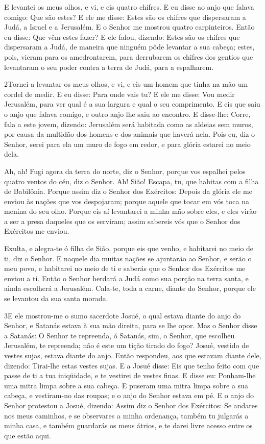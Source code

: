 E levantei os meus olhos, e vi, e eis quatro chifres. E eu
disse ao anjo que falava comigo: Que são estes? E ele me disse:
Estes são os chifres que dispersaram a Judá, a Israel e a Jerusalém.
E o Senhor me mostrou quatro carpinteiros. Então eu
disse: Que vêm estes fazer? E ele falou, dizendo: Estes são os
chifres que dispersaram a Judá, de maneira que ninguém pôde levantar
a sua cabeça; estes, pois, vieram para os amedrontarem, para
derrubarem os chifres dos gentios que levantaram o seu poder contra
a terra de Judá, para a espalharem.

\medskip

\lettrine{2} Tornei a levantar os meus olhos, e vi, e eis um
homem que tinha na mão um cordel de medir. E eu disse: Para onde
vais tu? E ele me disse: Vou medir Jerusalém, para ver qual é a sua
largura e qual o seu comprimento. E eis que saiu o anjo que
falava comigo, e outro anjo lhe saiu ao encontro. E disse-lhe:
Corre, fala a este jovem, dizendo: Jerusalém será habitada como as
aldeias sem muros, por causa da multidão dos homens e dos animais
que haverá nela. Pois eu, diz o Senhor, serei para ela um muro
de fogo em redor, e para glória estarei no meio dela.

Ah, ah! Fugi agora da terra do norte, diz o Senhor, porque vos
espalhei pelos quatro ventos do céu, diz o Senhor. Ah! Sião!
Escapa, tu, que habitas com a filha de Babilônia. Porque assim
diz o Senhor dos Exércitos: Depois da glória ele me enviou às nações
que vos despojaram; porque aquele que tocar em vós toca na menina do
seu olho. Porque eis aí levantarei a minha mão sobre eles, e
eles virão a ser a presa daqueles que os serviram; assim sabereis
vós que o Senhor dos Exércitos me enviou.

Exulta, e alegra-te ó filha de Sião, porque eis que venho, e
habitarei no meio de ti, diz o Senhor. E naquele dia muitas
nações se ajuntarão ao Senhor, e serão o meu povo, e habitarei no
meio de ti e saberás que o Senhor dos Exércitos me enviou a ti.
Então o Senhor herdará a Judá como sua porção na terra santa,
e ainda escolherá a Jerusalém. Cala-te, toda a carne, diante
do Senhor, porque ele se levantou da sua santa morada.

\medskip

\lettrine{3} E ele mostrou-me o sumo sacerdote Josué, o qual
estava diante do anjo do Senhor, e Satanás estava à sua mão direita,
para se lhe opor. Mas o Senhor disse a Satanás: O Senhor te
repreenda, ó Satanás, sim, o Senhor, que escolheu Jerusalém, te
repreenda; não é este um tição tirado do fogo? Josué, vestido de
vestes sujas, estava diante do anjo. Então respondeu, aos que
estavam diante dele, dizendo: Tirai-lhe estas vestes sujas. E a
Josué disse: Eis que tenho feito com que passe de ti a tua
iniqüidade, e te vestirei de vestes finas. E disse eu:
Ponham-lhe uma mitra limpa sobre a sua cabeça. E puseram uma mitra
limpa sobre a sua cabeça, e vestiram-no das roupas; e o anjo do
Senhor estava em pé. E o anjo do Senhor protestou a Josué,
dizendo: Assim diz o Senhor dos Exércitos: Se andares nos meus
caminhos, e se observares a minha ordenança, também tu julgarás a
minha casa, e também guardarás os meus átrios, e te darei livre
acesso entre os que estão aqui.

